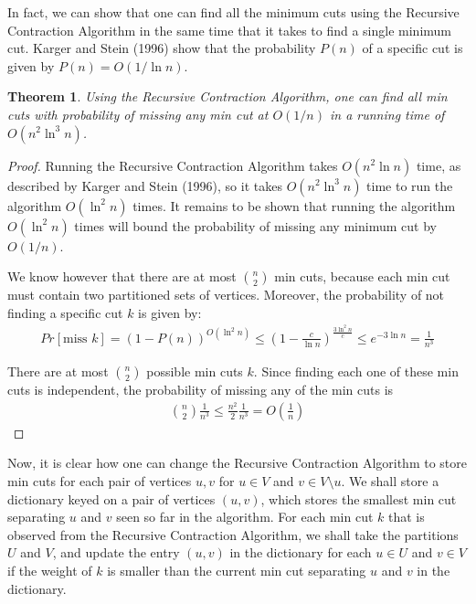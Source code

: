 \documentclass{article}
\theoremstyle{plain}
\newtheorem{theorem}{Theorem}
\begin{document}
In fact, we can show that one can find all the minimum cuts using the Recursive Contraction Algorithm in the same time that it takes to find a single minimum cut. Karger and Stein (1996) show that the probability $P(n)$ of a specific cut is given by $P(n) = O(1/ \ln n)$. 

\begin{theorem}
Using the Recursive Contraction Algorithm, one can find all min cuts with probability of missing any min cut at $O(1/n)$ in a running time of $O(n^2 \ln^3 n)$.
\end{theorem}
\begin{proof}
Running the Recursive Contraction Algorithm takes $O(n^2 \ln n)$ time, as described by Karger and Stein (1996), so it takes $O(n^2 \ln^3 n)$ time to run the algorithm $O( \ln^2 n)$ times. It remains to be shown that running the algorithm $O(\ln^2 n)$ times will bound the probability of missing any minimum cut by $O(1/n)$.

We know however that there are at most ${n \choose 2}$ min cuts, because each min cut must contain two partitioned sets of vertices. Moreover, the probability of not finding a specific cut $k$ is given by:
\begin{eqnarray}
  Pr[\textrm{miss }k] = (1 - P(n))^{O( \ln^2 n)} \leq \left(1 - \frac{c}{\ln n} \right)^{\frac{3 \ln^2 n}{c}} \leq e^{-3 \ln n} = \frac{1}{n^3}
\end{eqnarray}

There are at most ${n \choose 2}$ possible min cuts $k$. Since finding each one of these min cuts is independent, the probability of missing any of the min cuts is
\begin{eqnarray}
  {n \choose 2} \frac{1}{n^3} \leq \frac{n^2}{2} \frac{1}{n^3} = O \left( \frac{1}{n} \right)
\end{eqnarray}
\end{proof}

Now, it is clear how one can change the Recursive Contraction Algorithm to store min cuts for each pair of vertices $u,v$ for $u \in V$ and $v \in V \setminus u$. We shall store a dictionary keyed on a pair of vertices $(u,v)$, which stores the smallest min cut separating $u$ and $v$ seen so far in the algorithm. For each min cut $k$ that is observed from the Recursive Contraction Algorithm, we shall take the partitions $U$ and $V$, and update the entry $(u,v)$ in the dictionary for each $u \in U$ and $v \in V$ if the weight of $k$ is smaller than the current min cut separating $u$ and $v$ in the dictionary.
\end{document}
